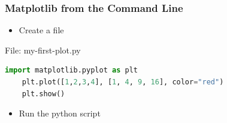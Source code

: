\begin{frame}[fragile]
	\frametitle{Matplotlib from the Command Line}
    \begin{itemize}
      \item Create a file 
    \end{itemize}
    \begin{block}{File: my-first-plot.py}
    \begin{lstlisting}[language=Python]
    import matplotlib.pyplot as plt
    plt.plot([1,2,3,4], [1, 4, 9, 16], color="red")
    plt.show()
    \end{lstlisting}      
		\end{block}		
    \begin{itemize}
      \item Run the python script 
    \end{itemize}			
\end{frame}